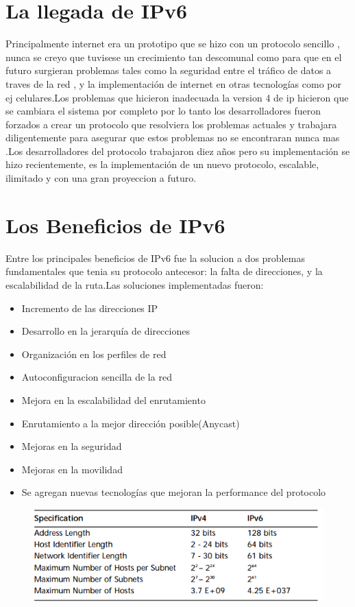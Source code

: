 \documentclass[11pt,a4paper]{article}
\begin{document}
\section{La llegada de IPv6}
Principalmente internet era un prototipo que se hizo con un protocolo sencillo , nunca se creyo que tuvisese un crecimiento tan descomunal como para que en el futuro surgieran problemas tales como la seguridad entre el tráfico de datos a traves de la red , y la implementación de internet en otras tecnologías como  por ej celulares.Los problemas que hicieron inadecuada la version 4 de ip hicieron que se cambiara el sistema por completo por lo tanto los desarrolladores fueron forzados a crear un protocolo que resolviera los problemas actuales y trabajara diligentemente para asegurar que estos problemas no se encontraran nunca mas .Los desarrolladores del protocolo trabajaron diez años pero su implementación se hizo recientemente, es la implementación de un nuevo protocolo, escalable, ilimitado y con una gran proyeccion a futuro.\par

\section{Los Beneficios de IPv6}
Entre los principales beneficios de IPv6 fue la solucion a dos problemas fundamentales que tenia su protocolo antecesor: la falta de direcciones, y la escalabilidad de la ruta.Las soluciones implementadas fueron:
\begin{itemize}
\item Incremento de las direcciones IP
\item Desarrollo en la jerarquía de direcciones
\item Organización en los perfiles de red
\item Autoconfiguracion sencilla de la red
\item Mejora en la escalabilidad del enrutamiento
\item Enrutamiento a la mejor dirección posible(Anycast)
\item Mejoras en la seguridad
\item Mejoras en la movilidad
\item Se agregan nuevas tecnologías que mejoran la performance del protocolo

\end {itemize}
\begin{figure}[h!]
 \centering
 \includegraphics[width=1\textwidth]{comparativo_ip.png}
\end{figure} \par
\end{document}
